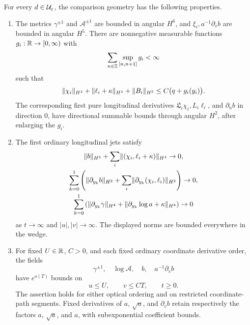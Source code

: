 \begin{proposition}\label{prop:bg-package}
For every $d\in\mathcal U_{\varepsilon}$, the comparison geometry has the following
properties.
\begin{enumerate}[label=\textup{(\roman*)}]
\item The metrics $\gamma^{\pm1}$ and $\mathcal A^{\pm1}$ are
bounded in angular $H^6$, and $\xi_i,a^{-1}\partial_vb$ are
bounded in angular $H^5$. There are nonnegative measurable functions
$g_i:\mathbb R\to[0,\infty)$ with
\begin{equation}\label{bg:cell-sum}
 \sum_{n\in\mathbb Z}\sup_{[n,n+1]}g_i<\infty
\end{equation}
such that
\begin{equation}\label{bg:directional-low}
 \lVert\chi_i\rVert_{H^4}+\lVert\ell_i+\kappa\rVert_{H^4}
       +\lVert B_i\rVert_{H^5}
 \le C\bigl(q+g_i(y_i)\bigr).
\end{equation}
The corresponding first pure longitudinal derivatives
$\mathfrak L_i\chi_i,L_i\ell_i$, and $\partial_u b$ in direction
$0$, have directional summable bounds through angular $H^2$,
after enlarging the $g_i$.
\item The first ordinary longitudinal jets satisfy
\begin{equation}\label{bg:low-jets}
\begin{gathered}
 \lVert b\rVert_{H^5}+\sum_i\lVert(\chi_i,\ell_i+\kappa)\rVert_{H^4}\to0,\\
 \sum_{k=0}^1\left(\lVert\partial_{y_k}b\rVert_{H^2}
       +\sum_i\lVert\partial_{y_k}(\chi_i,\ell_i)\rVert_{H^2}\right)\to0,\\
 \sum_{k=0}^1\left(\lVert\partial_{y_k}\gamma\rVert_{H^4}
       +\lVert\partial_{y_k}\log a+\kappa\rVert_{H^4}\right)\to0
\end{gathered}
\end{equation}
as $t\to\infty$ and $|u|,|v|\to\infty$. The displayed norms
are bounded everywhere in the wedge.
\item For fixed $U\in\mathbb R$, $C>0$, and each fixed ordinary
coordinate derivative order, the fields
\begin{equation}\label{bg:high-fields}
 \gamma^{\pm1},\quad\log\mathcal A,\quad b,
       \quad a^{-1}\partial_vb
\end{equation}
have $e^{o(T)}$ bounds on
\begin{equation}\label{bg:truncated-wedge}
 u\le U,\qquad v\le CT,\qquad t\ge0.
\end{equation}
The assertion holds for either optical ordering and on restricted
coordinate-path segments. Fixed derivatives of $a$, $\sqrt a$,
and $\partial_vb$ retain respectively the factors $a$, $\sqrt a$,
and $a$, with subexponential coefficient bounds.
\end{enumerate}
\end{proposition}

